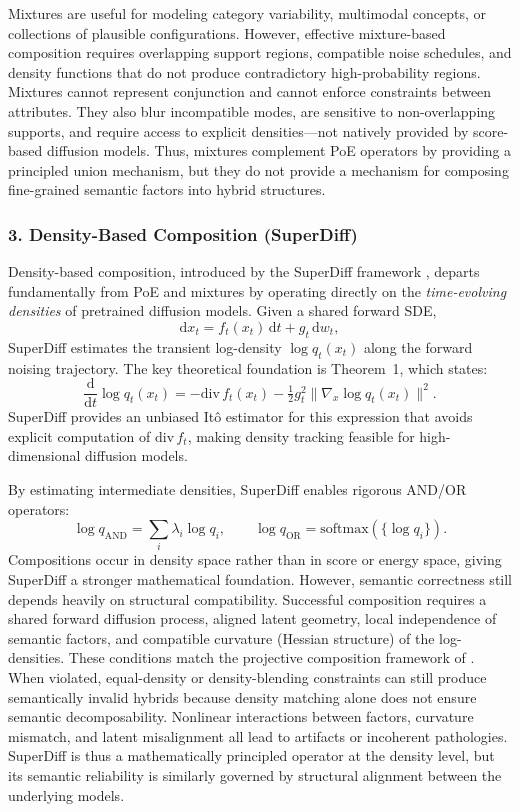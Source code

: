 Mixtures are useful for modeling category variability, multimodal concepts, or
collections of plausible configurations. However, effective mixture-based
composition requires overlapping support regions, compatible noise schedules, and
density functions that do not produce contradictory high-probability regions.
Mixtures cannot represent conjunction and cannot enforce constraints between
attributes. They also blur incompatible modes, are sensitive to non-overlapping
supports, and require access to explicit densities—not natively provided by
score-based diffusion models. Thus, mixtures complement PoE operators by
providing a principled union mechanism, but they do not provide a mechanism for
composing fine-grained semantic factors into hybrid structures.

\vspace{1em}
\subsubsection*{3. Density-Based Composition (SuperDiff)}

Density-based composition, introduced by the SuperDiff framework
\citep{skreta2024superposition}, departs fundamentally from PoE and mixtures by
operating directly on the \emph{time-evolving densities} of pretrained diffusion
models. Given a shared forward SDE,
\[
\mathrm{d}x_t = f_t(x_t)\,\mathrm{d}t + g_t\,\mathrm{d}w_t,
\]
SuperDiff estimates the transient log-density $\log q_t(x_t)$ along the forward
noising trajectory. The key theoretical foundation is Theorem~1, which states:
\[
\frac{\mathrm{d}}{\mathrm{d}t}\log q_t(x_t)
  = -\mathrm{div}\, f_t(x_t)
    -\tfrac{1}{2} g_t^2 \|\nabla_x \log q_t(x_t)\|^2.
\]
SuperDiff provides an unbiased It\^o estimator for this expression that avoids
explicit computation of $\mathrm{div}\,f_t$, making density tracking feasible for
high-dimensional diffusion models.

By estimating intermediate densities, SuperDiff enables rigorous AND/OR
operators:
\[
\log q_{\mathrm{AND}} = \sum_i \lambda_i \log q_i, \qquad
\log q_{\mathrm{OR}} = \mathrm{softmax}(\{\log q_i\}).
\]
Compositions occur in density space rather than in score or energy space, giving
SuperDiff a stronger mathematical foundation. However, semantic correctness
still depends heavily on structural compatibility. Successful composition
requires a shared forward diffusion process, aligned latent geometry, local
independence of semantic factors, and compatible curvature (Hessian structure) of
the log-densities. These conditions match the projective composition framework of
\citet{mechanisms2025projective}. When violated, equal-density or
density-blending constraints can still produce semantically invalid hybrids
because density matching alone does not ensure semantic decomposability.
Nonlinear interactions between factors, curvature mismatch, and latent
misalignment all lead to artifacts or incoherent pathologies. SuperDiff is thus
a mathematically principled operator at the density level, but its semantic
reliability is similarly governed by structural alignment between the underlying
models.

